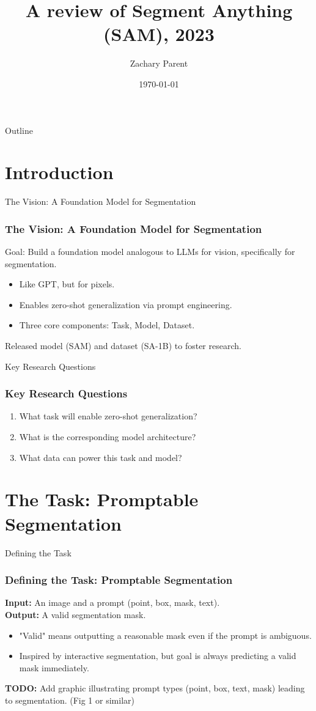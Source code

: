 \documentclass{beamer}
\title{A review of \textbf{Segment Anything (SAM)}, 2023}
\author{Zachary Parent}
\date{\today}
\institute{MAI}
\begin{document}
\begin{frame}
    \titlepage
\end{frame}

\begin{frame}{Outline}
    \tableofcontents
\end{frame}

\section{Introduction}

\begin{frame}{The Vision: A Foundation Model for Segmentation}
    \frametitle{The Vision: A Foundation Model for Segmentation}
    Goal: Build a foundation model analogous to LLMs for vision, specifically for segmentation.
    \begin{itemize}
        \item Like GPT, but for pixels.
        \item Enables zero-shot generalization via prompt engineering.
        \item Three core components: Task, Model, Dataset.
    \end{itemize}
    Released model (SAM) and dataset (SA-1B) to foster research.
\end{frame}

\begin{frame}{Key Research Questions}
    \frametitle{Key Research Questions}
    \begin{enumerate}
        \item What task will enable zero-shot generalization?
        \item What is the corresponding model architecture?
        \item What data can power this task and model?
    \end{enumerate}
\end{frame}

\section{The Task: Promptable Segmentation}

\begin{frame}{Defining the Task}
    \frametitle{Defining the Task: Promptable Segmentation}
    \textbf{Input:} An image and a prompt (point, box, mask, text). \\
    \textbf{Output:} A valid segmentation mask.
    \begin{itemize}
        \item "Valid" means outputting a reasonable mask even if the prompt is ambiguous.
        \item Inspired by interactive segmentation, but goal is always predicting a valid mask immediately.
    \end{itemize}
    \vfill
    \textbf{TODO:} Add graphic illustrating prompt types (point, box, text, mask) leading to segmentation. (Fig 1 or similar)
\end{frame}
\end{document}
